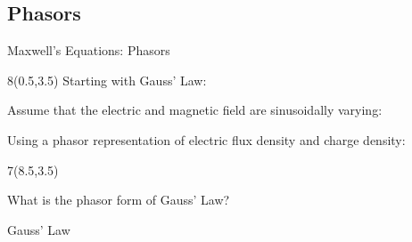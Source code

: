 \begin{lesson33}
\section{Phasors}
\begin{frame}{Maxwell's Equations: Phasors}
\begin{textblock}{8}(0.5,3.5)
\; Starting with Gauss' Law:
\begin{small}
\end{small}
\; Assume that the electric and magnetic field are sinusoidally varying:
\vspace{-8pt}

\vspace{-8pt}

\; Using a phasor representation of electric flux density and charge density:

\vspace{-18pt}

\begin{small}
\end{small}
\end{textblock}
\begin{textblock}{7}(8.5,3.5)
\begin{small}
\; What is the phasor form of Gauss' Law?
\end{small}
\begin{myblock}[0.9]{Gauss' Law}
\end{myblock}
\end{textblock}
\end{frame}


\end{lesson33}
